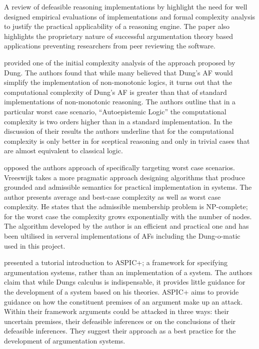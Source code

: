 A review of defeasible reasoning implementations by \cite{bryant2008review} highlight the need for well designed empirical evaluations of implementations and formal complexity analysis to justify the practical applicability of a reasoning engine. The paper also highlights the proprietary nature of successful argumentation theory based applications preventing researchers from peer reviewing the software.

\cite{dimopoulosfinding} provided one of the initial complexity analysis of the approach proposed by Dung. The authors found that while many believed that Dung's AF would simplify the implementation of non-monotonic logics, it turns out that the computational complexity of Dung's AF is greater than that of standard implementations of non-monotonic reasoning. The authors outline that in a particular worst case scenario, ``Autoepistemic Logic'' the computational complexity is two orders higher than in a standard implementation. In the discussion of their results the authors underline that for the computational complexity is only better in for sceptical reasoning and only in trivial cases that are almost equivalent to classical logic.

\cite{vreeswijk2006algorithm} opposed the authors approach of specifically targeting worst case scenarios. Vreeswijk takes a more pragmatic approach designing algorithms that produce grounded and admissible semantics for practical implementation in systems. The author presents average and best-case complexity as well as worst case complexity. He states that the admissible membership problem is NP-complete; for the worst case the complexity grows exponentially with the number of nodes. The algorithm developed by the author is an efficient and practical one and has been ultilised in serveral implementations of AFs including the Dung-o-matic used in this project.

\cite{modgil2014aspic+} presented a tutorial introduction to ASPIC+; a framework for specifying argumentation systems, rather than an implementation of a system. The authors claim that while Dungs calculus is indispensable, it provides little guidance for the development of a system based on his theories. ASPIC+ aims to provide guidance on how the constituent premises of an argument make up an attack. Within their framework arguments could be attacked in three ways: their uncertain premises, their defeasible inferences or on the conclusions of their defeasible inferences. They suggest their approach as a best practice for the development of argumentation systems.

